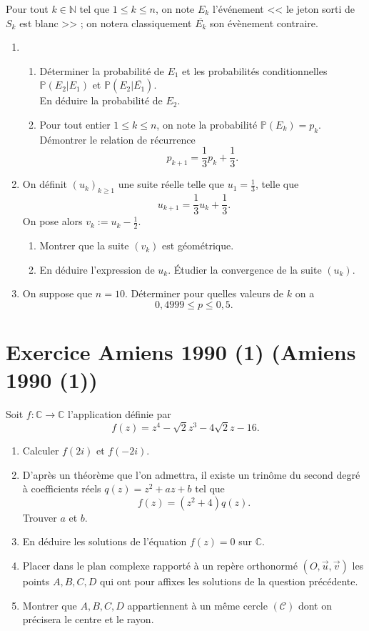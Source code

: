 \documentclass{article}
\makeatletter
\newcommand{\NN}{\mathbb N}
\newcommand{\CC}{\mathbb C}
\newcommand{\PP}{\mathbb P}
\newcounter{Exercice}
\newcommand{\exercice}[1][\@nil]{\refstepcounter{Exercice}
	\section*{Exercice \theExercice
	\def\tmp{#1}
	\ifx\tmp\@nnil
	\else
	(#1)
	\fi
}}
\makeatother
\begin{document}
Pour tout $k\in\NN$ tel que $1\leq k\leq n$, on note $E_k$ l'événement << le jeton sorti de $S_k$ est blanc >> ; on notera classiquement $\overline{E_k}$ son évènement contraire.

\begin{enumerate}
	\item \begin{enumerate}
		\item Déterminer la probabilité de $E_1$ et les probabilités conditionnelles $\PP(E_2|E_1)$ et $\PP(E_2|\overline{E_1})$.\\
		En déduire la probabilité de $E_2$.
		\item Pour tout entier $1\leq k\leq n$, on note la probabilité $\PP(E_k) = p_k$.\\
		Démontrer le relation de récurrence
		\[ p_{k+1} = \frac 1 3 p_k + \frac 1 3. \]
	\end{enumerate}
	\item On définit $(u_k)_{k\geq 1}$ une suite réelle telle que $u_1= \frac 1 3$, telle que 
	\[ u_{k+1} = \frac 1 3 u_k + \frac 1 3.\]
	On pose alors $v_k := u_k - \frac 1 2$.
	\begin{enumerate}
		\item Montrer que la suite $(v_k)$ est géométrique.
		\item En déduire l'expression de $u_k$. Étudier la convergence de la suite $(u_k)$.
	\end{enumerate}
	\item On suppose que $n=10$. Déterminer pour quelles valeurs de $k$ on a
	\[ 0{,}4999\leq p \leq 0{,}5. \]
\end{enumerate}

\exercice[Amiens 1990 (1)]

Soit $f:\CC\rightarrow\CC$ l'application définie par
\[ f(z) = z^4 - \sqrt 2 z^3 - 4\sqrt 2 z - 16. \]

\begin{enumerate}
	\item Calculer $f(2i)$ et $f(-2i)$.
	\item D'après un théorème que l'on admettra, il existe un trinôme du second degré à coefficients réels $q(z)= z^2+az+b$ tel que
	\[ f(z) = (z^2+4)q(z). \]
	Trouver $a$ et $b$.
	\item En déduire les solutions de l'équation $f(z) = 0$ sur $\CC$.
	\item Placer dans le plan complexe rapporté à un repère orthonormé $(O,\vec u,\vec v)$ les points $A,B,C,D$ qui ont pour affixes les solutions de la question précédente.
	\item Montrer que $A,B,C,D$ appartiennent à un même cercle $(\mathcal{C})$ dont on précisera le centre et le rayon.
\end{enumerate}
\end{document}
